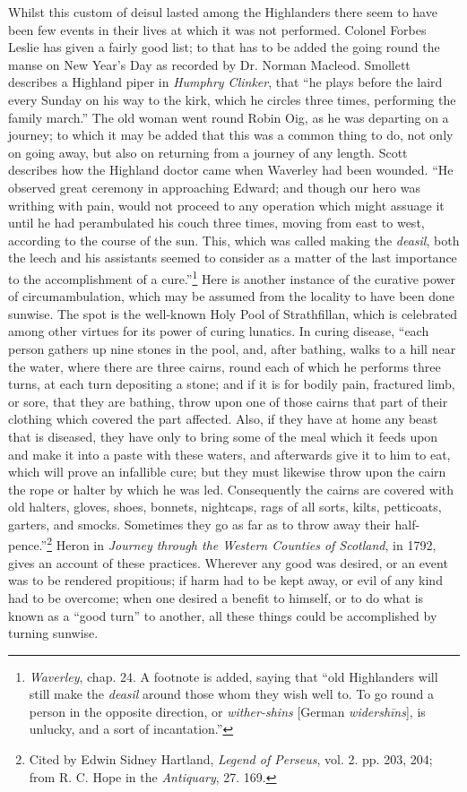 \documentclass[a4paper, 11pt, oneside, polutonikogreek, english]{article}
\begin{document}
Whilst this custom of deisul lasted among the Highlanders there seem to have been few events in their lives at which it was not performed. Colonel Forbes Leslie has given a fairly good list; to that has to be added the going round the manse on New Year's Day as recorded by Dr. Norman Macleod. Smollett describes a Highland piper in \emph{Humphry Clinker}, that ``he plays before the laird every Sunday on his way to the kirk, which he circles three times, performing the family march.'' The old woman went round Robin Oig, as he was departing on a journey; to which it may be added that this was a common thing to do, not only on going away, but also on returning from a journey of any length. Scott describes how the Highland doctor came when Waverley had been wounded. ``He observed great ceremony in approaching Edward; and though our hero was writhing with pain, would not proceed to any operation which might assuage it until he had perambulated his couch three times, moving from east to west, according to the course of the sun. This, which was called making the \emph{deasil}, both the leech and his assistants seemed to consider as a matter of the last importance to the accomplishment of a cure.''\footnote{\emph{Waverley}, chap. 24. A footnote is added, saying that ``old Highlanders will still make the \emph{deasil} around those whom they wish well to. To go round a person in the opposite direction, or \emph{wither-shins} [German \emph{widershīns}], is unlucky, and a sort of incantation.''} Here is another instance of the curative power of circumambulation, which may be assumed from the locality to have been done sunwise. The spot is the well-known Holy Pool of Strathfillan, which is celebrated among other virtues for its power of curing lunatics. In curing disease, ``each person gathers up nine stones in the pool, and, after bathing, walks to a hill near the water, where there are three cairns, round each of which he performs three turns, at each turn depositing a stone; and if it is for bodily pain, fractured limb, or sore, that they are bathing, throw upon one of those cairns that part of their clothing which covered the part affected. Also, if they have at home any beast that is diseased, they have only to bring some of the meal which it feeds upon and make it into a paste with these waters, and afterwards give it to him to eat, which will prove an infallible cure; but they must likewise throw upon the cairn the rope or halter by which he was led. Consequently the cairns are covered with old halters, gloves, shoes, bonnets, nightcaps, rags of all sorts, kilts, petticoats, garters, and smocks. Sometimes they go as far as to throw away their half-pence.''\footnote{Cited by Edwin Sidney Hartland, \emph{Legend of Perseus}, vol. 2. pp. 203, 204; from R. C. Hope in the \emph{Antiquary}, 27. 169.} Heron in \emph{Journey through the Western Counties of Scotland}, in 1792, gives an account of these practices. Wherever any good was desired, or an event was to be rendered propitious; if harm had to be kept away, or evil of any kind had to be overcome; when one desired a benefit to himself, or to do what is known as a ``good turn'' to another, all these things could be accomplished by turning sunwise.
\end{document}
